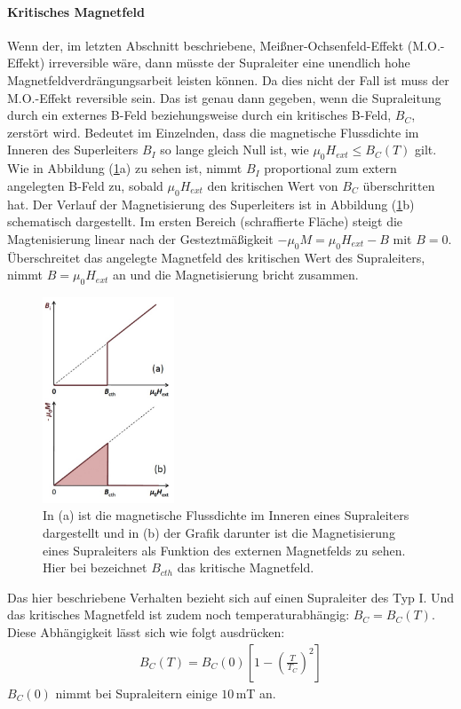 \paragraph{Kritisches Magnetfeld}
Wenn der, im letzten Abschnitt beschriebene, Mei{\ss}ner-Ochsen{\-}feld-Effekt (M.O.-Effekt) irreversible w\"{a}re, dann m\"{u}sste der Supraleiter eine unendlich hohe Magnetfeldverdrängungsarbeit leisten k\"{o}nnen.
Da dies nicht der Fall ist muss der M.O.-Effekt reversible sein.
Das ist genau dann gegeben, wenn die Supraleitung durch ein externes B-Feld beziehungsweise durch ein kritisches B-Feld, $B_C$, zerst\"{o}rt wird.
Bedeutet im Einzelnden, dass die magnetische Flussdichte im Inneren des Superleiters $B_I$ so lange gleich Null ist, wie $\mu_0H_{ext} \leq B_C(T)$ gilt.
Wie in Abbildung (\ref{abb:kritischesBFeld}a) zu sehen ist, nimmt $B_I$ proportional zum extern angelegten B-Feld zu, sobald $\mu_0H_{ext}$ den kritischen Wert von $B_C$ \"{u}berschritten hat.
Der Verlauf der Magnetisierung des Superleiters ist in Abbildung (\ref{abb:kritischesBFeld}b) schematisch dargestellt.
Im ersten Bereich (schraffierte Fl\"{a}che) steigt die Magtenisierung linear nach der Gesteztm\"{a}{\ss}igkeit $-\mu_0M = \mu_0H_{ext} - B$ mit $B = 0$.
\"Uberschreitet das angelegte Magnetfeld des kritischen Wert des Supraleiters, nimmt $B = \mu_0H_{ext}$ an und die Magnetisierung bricht zusammen.
\begin{figure}
	\centering
	\includegraphics[width=0.35\textwidth]{Plots/kritischesBFeld.png}
 	\caption{In (a) ist die magnetische Flussdichte im Inneren eines Supraleiters dargestellt und in (b) der Grafik darunter ist die Magnetisierung eines Supraleiters als Funktion des externen Magnetfelds zu sehen. Hier bei bezeichnet $B_{cth}$ das kritische Magnetfeld. \cite{einleitung}}
	\label{abb:kritischesBFeld}
\end{figure}
Das hier beschriebene Verhalten bezieht sich auf einen Supraleiter des Typ I.
Und das kritisches Magnetfeld ist zudem noch temperaturabh\"{a}ngig: $B_C = B_C(T)$.
Diese Abh\"{a}ngigkeit l\"{a}sst sich wie folgt ausdr\"{u}cken:
\begin{align*}
	B_C(T) = B_C(0) \left[ 1 - \left( \frac{T}{T_C} \right)^2 \right]
\end{align*}
$B_C(0)$ nimmt bei Supraleitern einige $10 \, $mT an.

